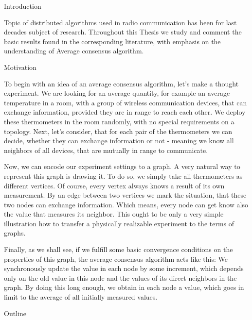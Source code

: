 
\def\ctustyle{{\tenss CTUstyle}}
\def\ttb{\tt\char'\\} %

\chap Introduction

Topic of distributed algorithms used in radio communication has been for last decades subject of research. Throughout this Thesis we study and comment the basic results found in the corresponding literature, with emphasis on the understanding of Average consensus algorithm.

\sec Motivation

To begin with an idea of an average consensus algorithm, let's make a thought experiment. We are looking for an average quantity, for example an average temperature in a room, with a group of wireless communication devices, that can exchange information, provided they are in range to reach each other. We deploy these thermometers in the room randomly, with no special requirements on a topology. Next, let's consider, that for each pair of the thermometers we can decide, whether they can exchange information or not - meaning we know all neighbors of all devices, that are mutually in range to communicate.

Now, we can encode our experiment settings to a graph. A very natural way to represent this graph is drawing it. To do so, we simply take all thermometers as different vertices. Of course, every vertex always knows a result of its own measurement. By an edge between two vertices we mark the situation, that these two nodes can exchange information. Which means, every node can get know also the value that measures its neighbor. This ought to be only a very simple illustration how to transfer a physically realizable experiment to the terms of graphs.

Finally, as we shall see, if we fulfill some basic convergence conditions on the properties of this graph, the average consensus algorithm acts like this: We synchronously update the value in each node by some increment, which depends only on the old value in this node and the values of its direct neighbors in the graph. By doing this long enough, we obtain in each node a value, which goes in limit to the average of all initially measured values.

\sec Outline


